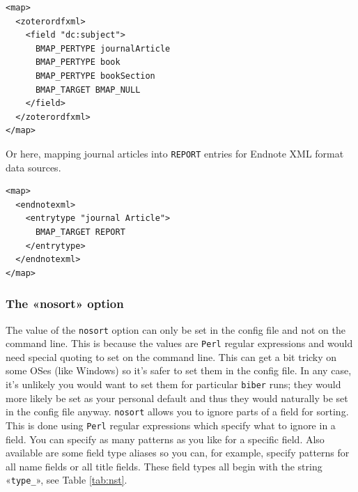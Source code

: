 \documentclass{ltxdockit}
\begin{document}
\lstset{showspaces=false}
\begin{lstlisting}[escapechar=+,mathescape=true]
<map>
  <zoterordfxml>
    <field "dc:subject">
      BMAP_PERTYPE journalArticle
      BMAP_PERTYPE book
      BMAP_PERTYPE bookSection
      BMAP_TARGET BMAP_NULL
    </field>
  </zoterordfxml>
</map>
\end{lstlisting}

\noindent Or here, mapping journal articles into \verb+REPORT+ entries for
Endnote XML format data sources.

\lstset{showspaces=false}
\begin{lstlisting}[escapechar=+,mathescape=true]
<map>
  <endnotexml>
    <entrytype "journal Article">
      BMAP_TARGET REPORT
    </entrytype>
  </endnotexml>
</map>
\end{lstlisting}
\bigskip
\subsubsection{The «nosort» option}

The value of the \verb+nosort+ option can only be set in the config file
and not on the command line. This is because the values are \verb+Perl+ regular
expressions and would need special quoting to set on the command line. This
can get a bit tricky on some OSes (like Windows) so it's safer to set them
in the config file. In any case, it's unlikely you would want to set them
for particular \verb+biber+ runs; they would more likely be set as your
personal default and thus they would naturally be set in the config file
anyway. \verb+nosort+ allows you to ignore parts of a field for sorting.
This is done using \verb+Perl+ regular expressions which specify what to
ignore in a field. You can specify as many patterns as you like for a
specific field. Also available are some field type aliases so you can, for
example, specify patterns for all name fields or all title fields. These
field types all begin with the string «\verb+type_+», see Table
\ref{tab:nst}.
\end{document}
